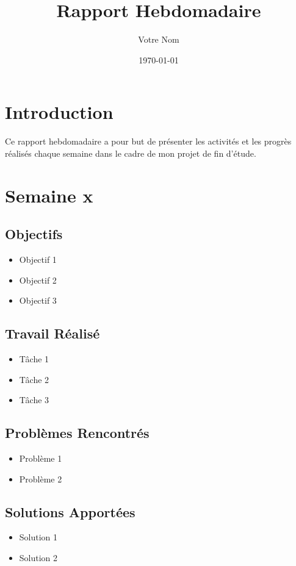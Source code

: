 \documentclass[a4paper, 12pt]{article}
\title{Rapport Hebdomadaire}
\author{Votre Nom}
\date{\today}
\begin{document}
\maketitle

\section*{Introduction}
Ce rapport hebdomadaire a pour but de présenter les activités et les progrès réalisés chaque semaine dans le cadre de mon projet de fin d'étude.

\section*{Semaine x}
\subsection*{Objectifs}
\begin{itemize}
    \item Objectif 1
    \item Objectif 2
    \item Objectif 3
\end{itemize}

\subsection*{Travail Réalisé}
\begin{itemize}
    \item Tâche 1
    \item Tâche 2
    \item Tâche 3
\end{itemize}

\subsection*{Problèmes Rencontrés}
\begin{itemize}
    \item Problème 1
    \item Problème 2
\end{itemize}

\subsection*{Solutions Apportées}
\begin{itemize}
    \item Solution 1
    \item Solution 2
\end{itemize}
\end{document}
